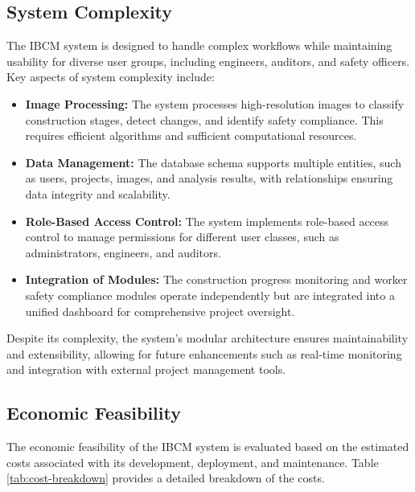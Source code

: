 \subsection{System Complexity}
The IBCM system is designed to handle complex workflows while maintaining usability for diverse user groups, including engineers, auditors, and safety officers. Key aspects of system complexity include:
\begin{itemize}
    \item \textbf{Image Processing:} The system processes high-resolution images to classify construction stages, detect changes, and identify safety compliance. This requires efficient algorithms and sufficient computational resources.
    \item \textbf{Data Management:} The database schema supports multiple entities, such as users, projects, images, and analysis results, with relationships ensuring data integrity and scalability.
    \item \textbf{Role-Based Access Control:} The system implements role-based access control to manage permissions for different user classes, such as administrators, engineers, and auditors.
    \item \textbf{Integration of Modules:} The construction progress monitoring and worker safety compliance modules operate independently but are integrated into a unified dashboard for comprehensive project oversight.
\end{itemize}
Despite its complexity, the system's modular architecture ensures maintainability and extensibility, allowing for future enhancements such as real-time monitoring and integration with external project management tools.

\subsection{Economic Feasibility}
The economic feasibility of the IBCM system is evaluated based on the estimated costs associated with its development, deployment, and maintenance. Table \ref{tab:cost-breakdown} provides a detailed breakdown of the costs.

